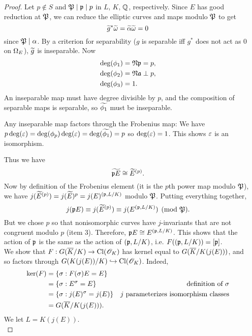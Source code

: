 \begin{proof}
Let $p\nin S$ and $\mathfrak{P}\mid \mathfrak{p}\mid p$ in $L$, $K$, $\mathbb{Q}$,  respectively. 
Since $E$ has good reduction at $\mathfrak{P}$, we can reduce the elliptic curves and maps modulo $\mathfrak{P}$ to get
\[
\widetilde{g}^* \widetilde{\omega}=\widetilde{\alpha}\widetilde{\omega}=0
\]
since $\mathfrak{P}\mid \alpha$. By a criterion for separability ($g$ is separable iff $g^*$ does not act as 0 on $\Omega_E$), $\widetilde{g}$ is inseparable. Now
\begin{align*}
\deg(\phi_1)&=\mathfrak{N}\mathfrak{p}=p,\\
\deg(\phi_2)&=\mathfrak{N}\mathfrak{a}\perp p,\\
\deg(\phi_3)&=1.
\end{align*}
An inseparable map must have degree divisible by $p$, and the composition of separable maps is separable, so $\widetilde{\phi_1}$ must be inseparable.

Any inseparable map factors through the Frobenius map:
\eeq
We have $p\deg(\varepsilon)=\deg(\phi_p)\deg(\varepsilon)=\deg(\widetilde{\phi_1})=p$ so $\deg(\varepsilon)=1$. This shows $\varepsilon$ is an isomorphism.

Thus we have 
\[
\widetilde{\mathfrak{p} E}\cong \widetilde{E}^{(p)}.
\]
Now by definition of the Frobenius element (it is the $p$th power map modulo $\mathfrak{P}$), we have $j(\widetilde{E}^{(p)})=j(\widetilde{E})^p=j(E)^{(\mathfrak{p},L/K)}$ modulo $\mathfrak{P}$. Putting everything together,
\[
j(\mathfrak{p} E)\equiv j(\widetilde{E}^{(p)})\equiv j(E^{(\mathfrak{p},L/K)})\pmod{\mathfrak{P}}.
\]
But we chose $p$ so that nonisomorphic curves have $j$-invariants that are not congruent modulo $p$ (item 3). Therefore, $\mathfrak{p} E\cong E^{(\mathfrak{p},L/K)}$. This shows that the action of $\mathfrak{p}$ is the same as the action of $(\mathfrak{p},L/K)$, i.e. $F((\mathfrak{p},L/K))=[\mathfrak{p}]$.\\

We show that $F:G(\overline{K}/K)\to \operatorname{Cl}(\mathscr{O}_K)$ has kernel equal to $G(\overline{K}/K(j(E)))$, and so factors through $G(K(j(E))/K)\hookrightarrow \operatorname{Cl}(\mathscr{O}_K)$. Indeed,
\begin{align*}
\ker(F)&=\left\{{\sigma}:{F(\sigma)E=E}\right\}\\
&=\left\{{\sigma}:{E^{\sigma}=E}\right\}&\text{definition of }\sigma\\
&=\left\{{\sigma}:{j(E)^{\sigma}=j(E)}\right\}&j \text{ parameterizes isomorphism classes}\\
&=G(\overline{K}/K(j(E))).
\end{align*}
We let $L=K(j(E))$.\\


\end{proof}
